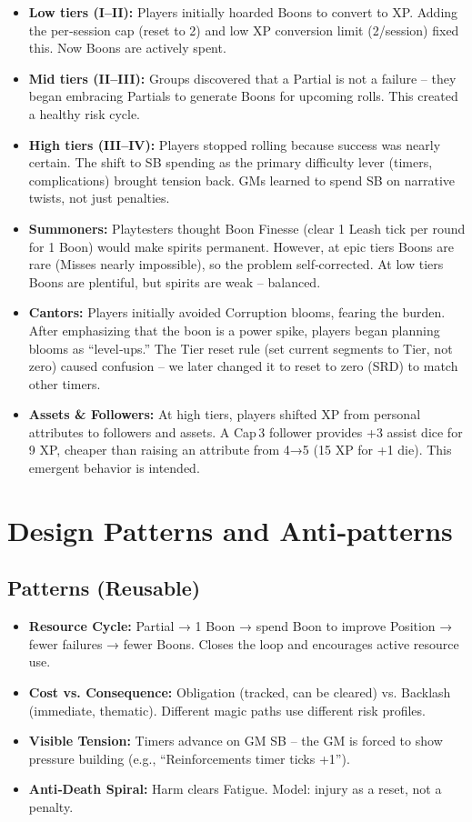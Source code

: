 \documentclass[11pt]{article}
\begin{document}
\begin{itemize}
    \item \textbf{Low tiers (I–II):} Players initially hoarded Boons to convert to XP. Adding the per‑session cap (reset to 2) and low XP conversion limit (2/session) fixed this. Now Boons are actively spent.
    \item \textbf{Mid tiers (II–III):} Groups discovered that a Partial is not a failure – they began embracing Partials to generate Boons for upcoming rolls. This created a healthy risk cycle.
    \item \textbf{High tiers (III–IV):} Players stopped rolling because success was nearly certain. The shift to SB spending as the primary difficulty lever (timers, complications) brought tension back. GMs learned to spend SB on narrative twists, not just penalties.
    \item \textbf{Summoners:} Playtesters thought Boon Finesse (clear 1 Leash tick per round for 1 Boon) would make spirits permanent. However, at epic tiers Boons are rare (Misses nearly impossible), so the problem self‑corrected. At low tiers Boons are plentiful, but spirits are weak – balanced.
    \item \textbf{Cantors:} Players initially avoided Corruption blooms, fearing the burden. After emphasizing that the boon is a power spike, players began planning blooms as “level‑ups.” The Tier reset rule (set current segments to Tier, not zero) caused confusion – we later changed it to reset to zero (SRD) to match other timers.
    \item \textbf{Assets \& Followers:} At high tiers, players shifted XP from personal attributes to followers and assets. A Cap 3 follower provides +3 assist dice for 9 XP, cheaper than raising an attribute from 4→5 (15 XP for +1 die). This emergent behavior is intended.
\end{itemize}

\section{Design Patterns and Anti‑patterns}
\label{sec:design-patterns}

\subsection{Patterns (Reusable)}
\begin{itemize}
    \item \textbf{Resource Cycle:} Partial → 1 Boon → spend Boon to improve Position → fewer failures → fewer Boons. Closes the loop and encourages active resource use.
    \item \textbf{Cost vs. Consequence:} Obligation (tracked, can be cleared) vs. Backlash (immediate, thematic). Different magic paths use different risk profiles.
    \item \textbf{Visible Tension:} Timers advance on GM SB – the GM is forced to show pressure building (e.g., “Reinforcements timer ticks +1”).
    \item \textbf{Anti‑Death Spiral:} Harm clears Fatigue. Model: injury as a reset, not a penalty.
\end{itemize}
\end{document}
